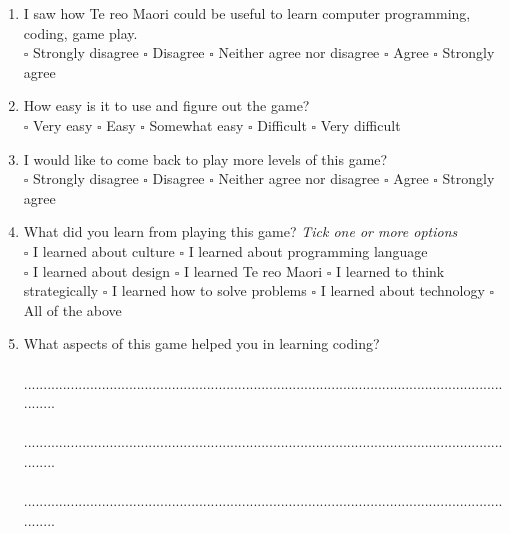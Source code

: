 \documentclass[12pt]{article}\pagestyle{myheadings}
\theoremstyle{plain}
\begin{document}
\begin{mdframed}

\begin{enumerate}

\item I saw how Te reo Maori could be useful to learn computer programming, coding, game play. \\
$\square$ Strongly disagree $\square$ Disagree $\square$ Neither agree nor disagree $\square$ Agree $\square$ Strongly agree


\item  How easy is it to use and figure out the game?\\
$\square$ Very easy $\square$ Easy $\square$ Somewhat easy $\square$ Difficult $\square$ Very difficult


\item I would like to come back to play more levels of this game?\\ 
$\square$ Strongly disagree $\square$ Disagree $\square$ Neither agree nor disagree $\square$ Agree $\square$ Strongly agree


\item What did you learn from playing this game? \textit{Tick one or more options}\\
$\square$  I learned about culture $\square$  I learned about programming language \\$\square$ I learned about design $\square$ I learned Te reo Maori $\square$ I learned to think strategically $\square$ I learned how to solve problems $\square$ I learned about technology
$\square$ All of the above
\item What aspects of this game helped you in learning coding?\\
\\...................................................................................................................................\\
\\...................................................................................................................................\\
\\...................................................................................................................................\\



\end{enumerate}
\end{mdframed}
\end{document}
